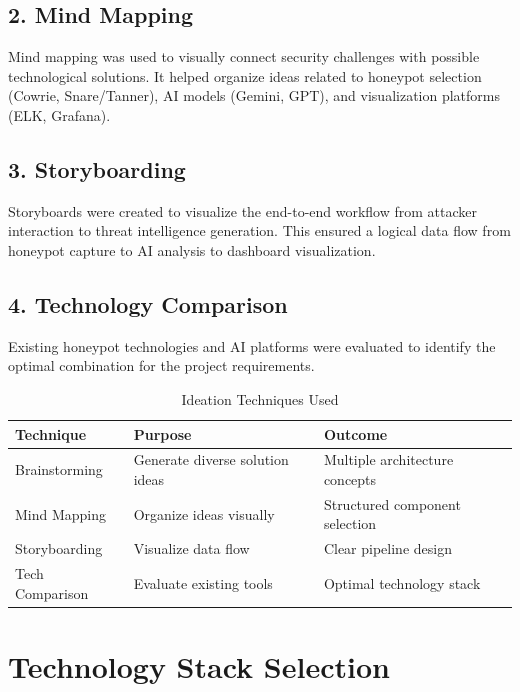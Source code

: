\documentclass[12pt,a4paper]{report}
\begin{document}
\subsection*{2. Mind Mapping}

Mind mapping was used to visually connect security challenges with possible technological solutions. It helped organize ideas related to honeypot selection (Cowrie, Snare/Tanner), AI models (Gemini, GPT), and visualization platforms (ELK, Grafana).

\subsection*{3. Storyboarding}

Storyboards were created to visualize the end-to-end workflow from attacker interaction to threat intelligence generation. This ensured a logical data flow from honeypot capture to AI analysis to dashboard visualization.

\subsection*{4. Technology Comparison}

Existing honeypot technologies and AI platforms were evaluated to identify the optimal combination for the project requirements.

\begin{table}[h]
\centering
\caption{Ideation Techniques Used}
\label{tab:ideation_techniques}
\begin{tabular}{|l|p{6cm}|p{4cm}|}
\hline
\textbf{Technique} & \textbf{Purpose} & \textbf{Outcome} \\
\hline
Brainstorming & Generate diverse solution ideas & Multiple architecture concepts \\
\hline
Mind Mapping & Organize ideas visually & Structured component selection \\
\hline
Storyboarding & Visualize data flow & Clear pipeline design \\
\hline
Tech Comparison & Evaluate existing tools & Optimal technology stack \\
\hline
\end{tabular}
\end{table}

\section{Technology Stack Selection}
\end{document}
